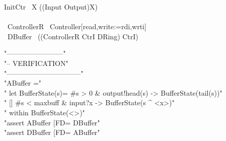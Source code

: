 \documentclass[10pt]{article}
\begin{document}
\begin{circus}
 \circspot InitCtr \circseq\ \circmu X \circspot ((Input \extchoice Output)\circseq X)
\\
\circend
\\
\circprocess\ ControllerR \circdef\ Controller[read,write:=rdi,wrti]
\\
\circprocess\ DBuffer \circdef\ ((ControllerR \lpar CtrI \rpar DRing) \circhide CtrI)
\end{circus}%
\begin{assert}
"------------------------"\\
\also"-- VERIFICATION"\\
\also"--------------------------------"\\
\also"ABuffer ="\\
\also"  let BufferState(s)= #s > 0 & output!head(s) -> BufferState(tail(s))"\\
\also"                      [] #s < maxbuff & input?x -> BufferState(s ^ <x>)"\\
\also"  within BufferState(<>)"\\
\also"assert ABuffer [FD= DBuffer"\\
\also"assert DBuffer [FD= ABuffer"
\end{assert}
\end{document}
